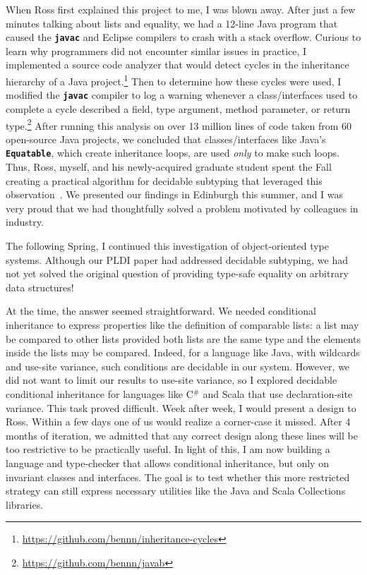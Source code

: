 \documentclass[12pt]{article}
\newcommand{\mono}[1]{\textbf{\texttt{#1}}}
\newcommand{\hdr}[2]{\vspace{-0.4cm}{\flushleft{\hrulefill\\\textbf{#1}\hfill{#2}\\\vspace{-0.2cm}\hrulefill}}\vspace{0.1cm}}
\begin{document}
When Ross first explained this project to me, I was blown away.
After just a few minutes talking about lists and equality, we had a 12-line Java program that caused the \mono{javac} and Eclipse compilers to crash with a stack overflow.
Curious to learn why programmers did not encounter similar issues in practice, I implemented a source code analyzer that would detect cycles in the inheritance hierarchy of a Java project.\footnote{\url{https://github.com/bennn/inheritance-cycles}}
Then to determine how these cycles were used, I modified the \mono{javac} compiler to log a warning whenever a class/interfaces used to complete a cycle described a field, type argument, method parameter, or return type.\footnote{\url{https://github.com/bennn/javab}}
After running this analysis on over 13 million lines of code taken from 60 open-source Java projects, we concluded that classes/interfaces like Java's \mono{Equatable}, which create inheritance loops, are used \emph{only} to make such loops.
Thus, Ross, myself, and his newly-acquired graduate student spent the Fall creating a practical algorithm for decidable subtyping that leveraged this observation~\cite{shapes}.
We presented our findings in Edinburgh this summer, and I was very proud that we had thoughtfully solved a problem motivated by colleagues in industry.

\hdr{Conditional Inheritance}{Spring 2014}

The following Spring, I continued this investigation of object-oriented type systems.
Although our PLDI paper had addressed decidable subtyping, we had not yet solved the original question of providing type-safe equality on arbitrary data structures!

At the time, the answer seemed straightforward.
We needed conditional inheritance to express properties like the definition of comparable lists: a list may be compared to other lists provided both lists are the same type and the elements inside the lists may be compared.
Indeed, for a language like Java, with wildcards and use-site variance, such conditions are decidable in our system.
However, we did not want to limit our results to use-site variance, so I explored decidable conditional inheritance for languages like C$^{\#}$ and Scala that use declaration-site variance.
This task proved difficult.
Week after week, I would present a design to Ross.
Within a few days one of us would realize a corner-case it missed.
After 4 months of iteration, we admitted that any correct design along these lines will be too restrictive to be practically useful.
In light of this, I am now building a language and type-checker that allows conditional inheritance, but only on invariant classes and interfaces.
The goal is to test whether this more restricted strategy can still express necessary utilities like the Java and Scala Collections libraries.
\end{document}
